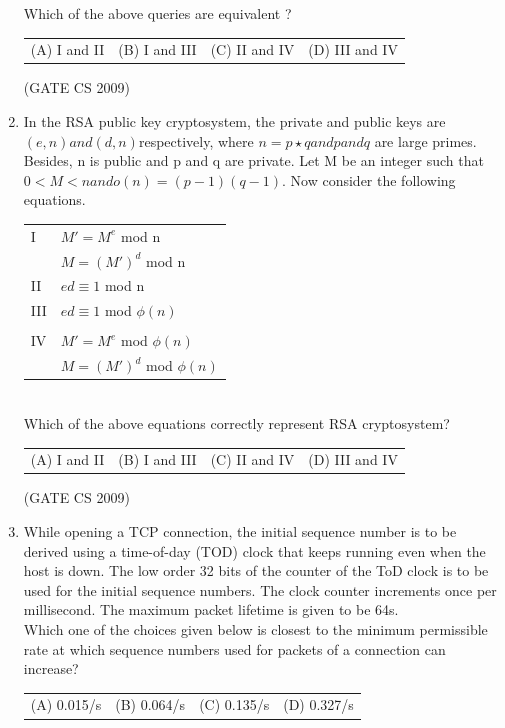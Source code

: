 \documentclass[a4paper, 11pt]{article}
\begin{document}
\begin{enumerate}
    Which of the above queries are equivalent ?\\
    \begin{tabularx}{\textwidth}{@{}XXXX@{}}
       (A) I and II  & (B) I and III & (C) II and IV & (D) III and IV  \\
    \end{tabularx}

    \hfill (GATE CS 2009)

    \item In the RSA public key cryptosystem, the private and public keys are $(e, n) and (d, n)$respectively, where $n=p\star q and p and q$ are large primes. Besides, n is public and p and q are private. Let M be an integer such that $0<M<n and o(n)=(p-1)(q-1)$. Now consider the following equations.\\
    \begin{tabular}{ll}
        I & $M' = M^e$  mod n\\
         & $M = (M')^d$ mod n\\
        II & $ed \equiv 1 $ mod n\\
        III & $ed \equiv 1 $ mod $\phi(n)$\\ \\
        IV & $M' = M^e$  mod $\phi(n)$\\
           & $M = (M')^d$  mod $\phi(n)$\\
    \end{tabular}\\
    Which of the above equations correctly represent RSA cryptosystem?\\
    \begin{tabularx}{\textwidth}{@{}XXXX@{}}
       (A) I and II  & (B) I and III & (C) II and IV & (D) III and IV  \\
    \end{tabularx}

    \hfill (GATE CS 2009)
    
     \item While opening a TCP connection, the initial sequence number is to be derived using a time-of-day (TOD) clock that keeps running even when the host is down. The low order 32 bits of the counter of the ToD clock is to be used for the initial sequence numbers. The clock counter increments once per millisecond. The maximum packet lifetime is given to be 64s.\\
    Which one of the choices given below is closest to the minimum permissible rate at which sequence numbers used for packets of a connection can increase?\\
    \begin{tabularx}{\textwidth}{@{}XXXX@{}}
       (A)  0.015/s  & (B) 0.064/s & (C) 0.135/s & (D) 0.327/s  \\
    \end{tabularx}
    

\end{enumerate}
\end{document}
